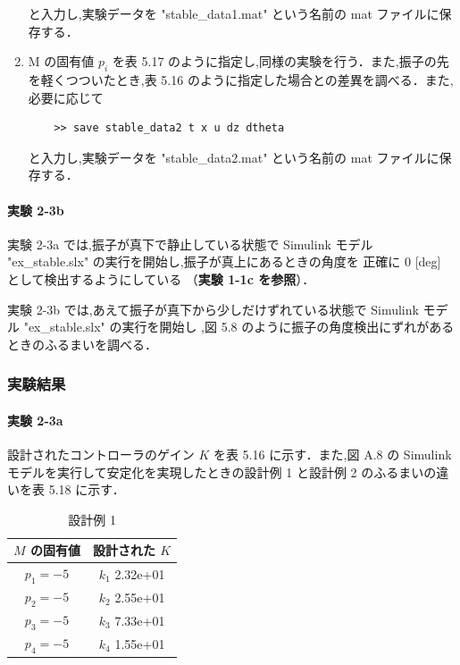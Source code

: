 \begin{enumerate}
        と入力し,実験データを "stable\_data1.mat" という名前の mat ファイルに保存する．
        
  \item M の固有値 \( p_i \) を表 5.17 のように指定し,同様の実験を行う．また,振子の先を軽くつついたとき,表 5.16 のように指定した場合との差異を調べる．また,必要に応じて
        
        \begin{tcolorbox}[colback=gray!5!white,colframe=gray!75!black]
          \begin{lstlisting}
    >> save stable_data2 t x u dz dtheta
    \end{lstlisting}
        \end{tcolorbox}
        
        と入力し,実験データを "stable\_data2.mat" という名前の mat ファイルに保存する．
\end{enumerate}

\paragraph{実験 2-3b}
実験 2-3a では,振子が真下で静止している状態で Simulink モデル 
"ex\_stable.slx" の実行を開始し,振子が真上にあるときの角度を
正確に 0 [deg] として検出するようにしている
（\textbf{実験 1-1c を参照}）．

実験 2-3b では,あえて振子が真下から少しだけずれている状態で
Simulink モデル "ex\_stable.slx" の実行を開始し
,図 5.8 のように振子の角度検出にずれがあるときのふるまいを調べる．

\subsubsection{実験結果}

\paragraph{実験 2-3a}
設計されたコントローラのゲイン \( K \) を表 5.16 に示す．また,図 A.8 の Simulink モデルを実行して安定化を実現したときの設計例 1 と設計例 2 のふるまいの違いを表 5.18 に示す．

\begin{table}[h]
  \centering
  \caption{設計例 1}
  \label{tab:design_example_1}
  \begin{tabular}{|c|c|}
    \hline
    \( M \) の固有値 & 設計された \( K \)  \\
    \hline
    \( p_1 = -5 \)   & \( k_1 \) 2.32e+01  \\
    \( p_2 = -5 \)   & \( k_2 \) 2.55e+01  \\
    \( p_3 = -5 \)   & \( k_3 \)  7.33e+01 \\
    \( p_4 = -5 \)   & \( k_4 \)  1.55e+01 \\
    \hline
  \end{tabular}
\end{table}

